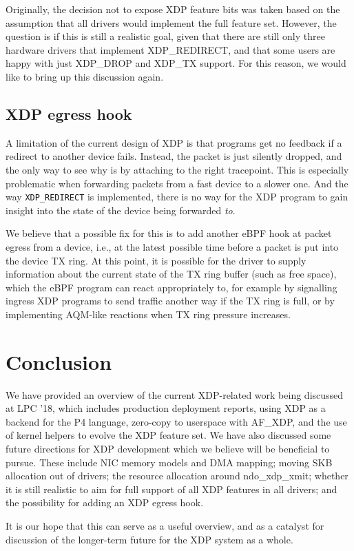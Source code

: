 \documentclass[sigconf]{acmart}
\begin{document}
Originally, the decision not to expose XDP feature bits was taken based on the
assumption that all drivers would implement the full feature set. However, the
question is if this is still a realistic goal, given that there are still only
three hardware drivers that implement XDP\_REDIRECT, and that some users are
happy with just XDP\_DROP and XDP\_TX support. For this reason, we would like to
bring up this discussion again.


\subsection{XDP egress hook}
\label{sec:xdp-egress-hook}

A limitation of the current design of XDP is that programs get no feedback if a
redirect to another device fails. Instead, the packet is just silently dropped,
and the only way to see why is by attaching to the right tracepoint. This is
especially problematic when forwarding packets from a fast device to a slower
one. And the way \texttt{XDP\_REDIRECT} is implemented, there is no way for the
XDP program to gain insight into the state of the device being forwarded
\emph{to}.

We believe that a possible fix for this is to add another eBPF hook at packet
egress from a device, i.e., at the latest possible time before a packet is put
into the device TX ring. At this point, it is possible for the driver to supply
information about the current state of the TX ring buffer (such as free space),
which the eBPF program can react appropriately to, for example by signalling
ingress XDP programs to send traffic another way if the TX ring is full, or by
implementing AQM-like reactions when TX ring pressure increases.

\section{Conclusion}
\label{sec:conclusion}

We have provided an overview of the current XDP-related work being discussed at
LPC '18, which includes production deployment reports, using XDP as a backend
for the P4 language, zero-copy to userspace with AF\_XDP, and the use of kernel
helpers to evolve the XDP feature set. We have also discussed some future
directions for XDP development which we believe will be beneficial to pursue.
These include NIC memory models and DMA mapping; moving SKB allocation out of
drivers; the resource allocation around ndo\_xdp\_xmit; whether it is still
realistic to aim for full support of all XDP features in all drivers; and the
possibility for adding an XDP egress hook.

It is our hope that this can serve as a useful overview, and as a catalyst for
discussion of the longer-term future for the XDP system as a whole.




\end{document}
